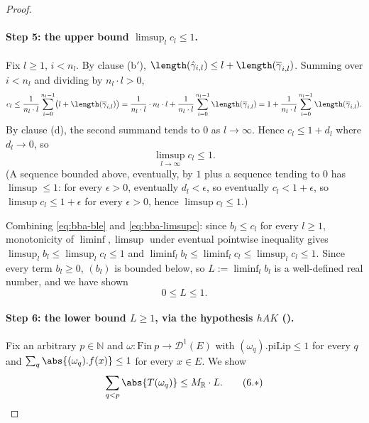 \begin{proof}
  \paragraph{Step 5: the upper bound $\limsup_l c_l \le 1$.} Fix $l\ge1$, $i<n_l$. By
   clause (b$'$), $\length(\hat\gamma_{i,l}) \le l+\length(\overline\gamma_{i,l})$.
  Summing over $i<n_l$ and dividing by $n_l\cdot l>0$,
  \[
    c_l \le \frac1{n_l\cdot l}\sum_{i=0}^{n_l-1}\bigl(l+\length(\overline\gamma_{i,l})\bigr)
    = \frac1{n_l\cdot l}\cdot n_l\cdot l + \frac1{n_l\cdot l}\sum_{i=0}^{n_l-1}\length(\overline\gamma_{i,l})
    = 1+\frac1{n_l\cdot l}\sum_{i=0}^{n_l-1}\length(\overline\gamma_{i,l})
    .
  \]
  By  clause (d), the second summand tends to $0$ as $l\to\infty$. Hence
  $c_l \le 1+d_l$ where $d_l\to0$, so
  \begin{equation}\label{eq:bba-limsupc}
    \limsup_{l\to\infty} c_l \le 1
    . \tag{$\ast\ast$}
  \end{equation}
  (A sequence bounded above, eventually, by $1$ plus a sequence tending to $0$ has $\limsup\le1$:
  for every $\epsilon>0$, eventually $d_l<\epsilon$, so eventually $c_l<1+\epsilon$, so
  $\limsup c_l\le1+\epsilon$ for every $\epsilon>0$, hence $\limsup c_l\le1$.)

  Combining \eqref{eq:bba-ble} and \eqref{eq:bba-limsupc}: since $b_l\le c_l$ for every $l\ge1$,
  monotonicity of $\liminf,\limsup$ under eventual pointwise inequality gives
  $\limsup_l b_l\le\limsup_l c_l\le1$ and $\liminf_l b_l\le\liminf_l c_l\le\limsup_l c_l\le1$. Since
  every term $b_l\ge0$, $(b_l)$ is bounded below, so $L:=\liminf_l b_l$ is a well-defined real
  number, and we have shown
  \begin{equation}\label{eq:bba-Lle1}
    0\le L\le1
    . \tag{$\dagger$}
  \end{equation}

  \paragraph{Step 6: the lower bound $L\ge1$, via the hypothesis $hAK$
  ().} Fix an arbitrary
  $p\in\mathbb N$ and $\omega\colon\mathrm{Fin}\ p\to\mathcal D^1(E)$ with $(\omega_q).\mathrm{piLip}
  \le1$ for every $q$ and $\sum_{q}\abs{(\omega_q).f(x)}\le1$ for every $x\in E$. We show
  \begin{equation}\label{eq:bba-sup-bound}
    \sum_{q<p}\abs{T(\omega_q)} \le M_{\mathbb R}\cdot L
    . \tag{6.$\ast$}
  \end{equation}


\end{proof}
